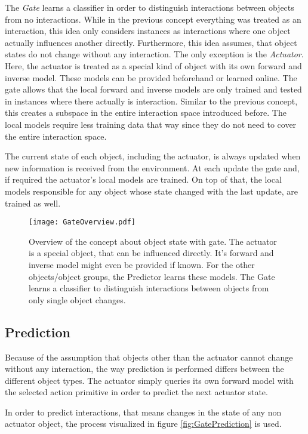 The \textit{Gate} learns a classifier in order to distinguish interactions between objects from no interactions. While in the previous concept everything was treated as an interaction, this idea only considers instances as interactions where one object actually influences another directly. Furthermore, this idea assumes, that object states do not change without any interaction. The only exception is the \textit{Actuator}. Here, the actuator is treated as a special kind of object with its own forward and inverse model. These models can be provided beforehand or learned online. 
The gate allows that the local forward and inverse models are only trained and tested in instances where there actually is interaction. Similar to the previous concept, this creates a subspace in the entire interaction space introduced before. The local models require less training data that way since they do not need to cover the entire interaction space. 

The current state of each object, including the actuator, is always updated when new information is received from the environment. At each update the gate and, if required the actuator's local models are trained. On top of that, the local models responsible for any object whose state changed with the last update, are trained as well.


\begin{figure}
	\centering
	\texttt{[image: GateOverview.pdf]}
	\caption{Overview of the concept about object state with gate. The actuator is a special object, that can be influenced directly. It's forward and inverse model might even be provided if known. For the other objects/object groups, the Predictor learns these models. The Gate learns a classifier to distinguish interactions between objects from only single object changes.} 
	\label{fig:GateOverview}
\end{figure}

\subsection{Prediction}

Because of the assumption that objects other than the actuator cannot change without any interaction, the way prediction is performed differs between the different object types. The actuator simply queries its own forward model with the selected action primitive in order to predict the next actuator state. 

In order to predict interactions, that means changes in the state of any non actuator object, the process visualized in figure \ref{fig:GatePrediction} is used.

